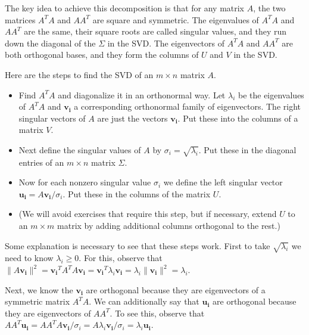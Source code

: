 \documentclass[11pt,oneside]{amsbook}
\theoremstyle{definition}
\theoremstyle{plain}
\theoremstyle{definition}
\theoremstyle{remark}
\numberwithin{equation}{section}
\numberwithin{figure}{section}
\begin{document}
The key idea to achieve this decomposition is that for any matrix $A$, the two matrices $A^TA$ and $AA^T$ are square and symmetric. The eigenvalues of $A^TA$ and $AA^T$ are the same, their square roots are called singular values, and they run down the diagonal of the $\Sigma$ in the SVD. The eigenvectors of $A^TA$ and $AA^T$ are both orthogonal bases, and they form the columns of $U$ and $V$ in the SVD.

Here are the steps to find the SVD of an $m\times n$ matrix $A$.

\begin{itemize}
  \item Find $A^TA$ and diagonalize it in an orthonormal way. Let $\lambda_i$ be the eigenvalues of $A^TA$ and $\bm{v_i}$ a corresponding orthonormal family of eigenvectors. The right singular vectors of $A$ are just the vectors $\bm{v_i}$. Put these into the columns of a matrix $V$.
  \item Next define the singular values of $A$ by $\sigma_i=\sqrt{\lambda_i}$. Put these in the diagonal entries of an $m\times n$ matrix $\Sigma$.
  \item Now for each nonzero singular value $\sigma_i$ we define the left singular vector $\bm{u_i}=A\bm{v_i}/\sigma_i$. Put these in the columns of the matrix $U$.
  \item (We will avoid exercises that require this step, but if necessary, extend $U$ to an $m\times m$ matrix by adding additional columns orthogonal to the rest.)
\end{itemize}

Some explanation is necessary to see that these steps work. First to take $\sqrt{\lambda_i}$ we need to know $\lambda_i\geq0$. For this, observe that $\|A\bm{v_i}\|^2=\bm{v_i}^TA^TA\bm{v_i}=\bm{v_i}^T\lambda_i\bm{v_i}=\lambda_i\|\bm{v_i}\|^2=\lambda_i$.

Next, we know the $\bm{v_i}$ are orthogonal because they are eigenvectors of a symmetric matrix $A^TA$. We can additionally say that $\bm{u_i}$ are orthogonal because they are eigenvectors of $AA^T$. To see this, observe that $AA^T\bm{u_i}=AA^TA\bm{v_i}/\sigma_i=A\lambda_i\bm{v_i}/\sigma_i=\lambda_i\bm{u_i}$.
\end{document}
